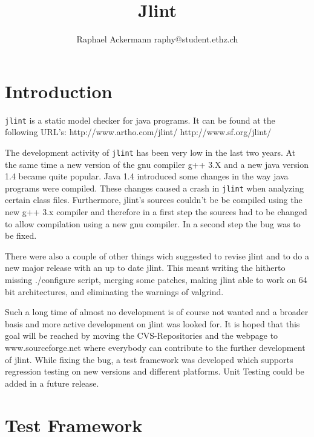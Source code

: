 \documentclass[11pt,twoside,a4paper,draft]{article}
\author{Raphael Ackermann raphy@student.ethz.ch}
\title{Jlint}
\begin{document}
\maketitle

\newpage

\tableofcontents

\newpage

\section {Introduction}

\texttt{jlint} is a static model checker for java programs. \newline
It can be found at the following URL's: 
http://www.artho.com/jlint/ \newline
http://www.sf.org/jlint/ \newline

The development activity of \texttt{jlint} has been very low in the last two years.
At the same time a new version of the gnu compiler g++ 3.X and a new java
version 1.4 became quite popular. Java 1.4 introduced some changes in the way
java programs were compiled. These changes caused a crash in \texttt{jlint}
when analyzing certain class files. Furthermore, jlint's sources couldn't be
be compiled using the new g++ 3.x compiler and therefore in a first step the
sources had to be changed to allow compilation using a new gnu compiler. In a
second step the bug was to be fixed.

There were also a couple of other things wich suggested to revise jlint and
to do a new major release with an up to date jlint. This meant writing
the hitherto missing ./configure script, merging some patches, making 
jlint able to work on 64 bit architectures, and eliminating the warnings
of valgrind.

Such a long time of almost no development is of course not wanted and
a broader basis and more active development on jlint was looked for.
It is hoped that this goal will be reached by moving the CVS-Repositories 
and the webpage to www.sourceforge.net where everybody can contribute 
to the further development of jlint.
While fixing the bug, a test framework was developed which supports
regression testing on new versions and different platforms.
Unit Testing could be added in a future release.

\section {Test Framework}
\end{document}

